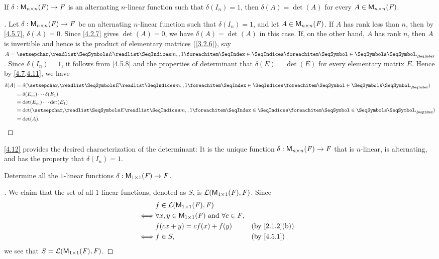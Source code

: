 \begin{thm}\label{4.12}
	If \(\delta : \mathsf{M}_{{n} \times n}({\mathit{F}}) \to \mathit{F}\) is an alternating \(n\)-linear function such that \(\delta(I_n) = 1\), then \(\delta(A) = \det(A)\) for every \(A \in \mathsf{M}_{{n} \times n}({\mathit{F}})\).
\end{thm}

\begin{proof}[]
	Let \(\delta : \mathsf{M}_{{n} \times n}({\mathit{F}}) \to \mathit{F}\) be an alternating \(n\)-linear function such that \(\delta(I_n) = 1\), and let \(A \in \mathsf{M}_{{n} \times n}({\mathit{F}})\).
	If \(A\) has rank less than \(n\), then by \cref{4.5.7}, \(\delta(A) = 0\).
	Since \cref{4.2.7} gives \(\det(A) = 0\), we have \(\delta(A) = \det(A)\) in this case.
	If, on the other hand, \(A\) has rank \(n\), then \(A\) is invertible and hence is the product of elementary matrices (\cref{3.2.6}), say \(A = \seq[]{E}{m,,1}\).
	Since \(\delta(I_n) = 1\), it follows from \cref{4.5.8} and the properties of determinant that \(\delta(E) = \det(E)\) for every elementary matrix \(E\).
	Hence by \cref{4.7,4.11}, we have
	\begin{align*}
		\delta(A) & = \delta(\seq[]{E}{m,,1})        \\
		          & = \delta(E_m) \cdots \delta(E_1) \\
		          & = \det(E_m) \cdots \det(E_1)     \\
		          & = \det(\seq[]{E}{m,,1})          \\
		          & = \det(A).
	\end{align*}
\end{proof}

\begin{note}
	\cref{4.12} provides the desired characterization of the determinant:
	It is the unique function \(\delta : \mathsf{M}_{{n} \times n}({\mathit{F}}) \to \mathit{F}\) that is \(n\)-linear, is alternating, and has the property that \(\delta(I_n) = 1\).
\end{note}

\exercisesection

\setcounter{ex}{1}
\begin{ex}\label{ex:4.5.2}
	Determine all the \(1\)-linear functions \(\delta : \mathsf{M}_{{1} \times 1}({\mathit{F}}) \to \mathit{F}\).
\end{ex}

\begin{proof}[]
	We claim that the set of all \(1\)-linear functions, denoted as \(S\), is \(\mathcal{L}(\mathsf{M}_{{1} \times 1}({\mathit{F}}), \mathit{F})\).
	Since
	\begin{align*}
		     & f \in \ls(\ms{1}{1}{\F}, \F)                                                     \\
		\iff & \forall x, y \in \ms{1}{1}{\F} \text{ and } \forall c \in \F,                    \\
		     & f(cx + y) = cf(x) + f(y)                                      &  & \by{2.1.2}[b] \\
		\iff & f \in S,                                                      &  & \by{4.5.1}
	\end{align*}
	we see that \(S = \mathcal{L}(\mathsf{M}_{{1} \times 1}({\mathit{F}}), \mathit{F})\).
\end{proof}

